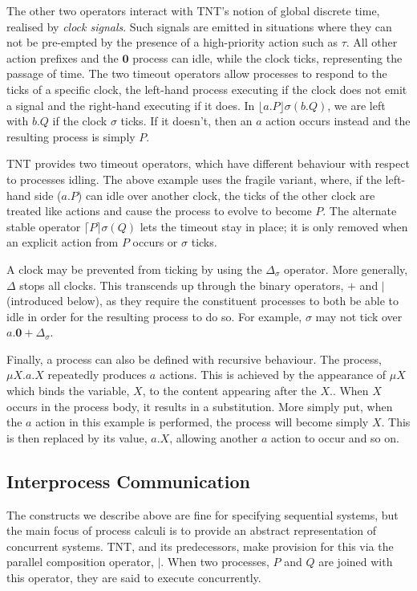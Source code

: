 \documentclass{sig-alternate}
\newcommand{\nil}{\textbf{0}}
\newcommand{\timeout}[3]{\lfloor{#1}\rfloor {#2} ({#3})}
\newcommand{\stimeout}[3]{\lceil{#1}\rceil {#2} ({#3})}
\begin{document}
The other two operators interact with TNT's notion of global discrete
time, realised by \emph{clock signals}.  Such signals are emitted in
situations where they can not be pre-empted by the presence of a
high-priority action such as $\tau$.  All other action prefixes and the
$\nil$ process can idle, while the clock ticks, representing the passage
of time.  The two timeout operators allow processes to respond to the
ticks of a specific clock, the left-hand process executing if the clock
does not emit a signal and the right-hand executing if it does.  In
$\timeout{a.P}{\sigma}{b.Q}$, we are left with $b.Q$ if the clock
$\sigma$ ticks.  If it doesn't, then an $a$ action occurs instead and
the resulting process is simply $P$.

TNT provides two timeout operators, which have different behaviour with
respect to processes idling.  The above example uses the fragile
variant, where, if the left-hand side ($a.P$) can idle over another
clock, the ticks of the other clock are treated like actions and cause
the process to evolve to become $P$.  The alternate stable operator
$\stimeout{P}{\sigma}{Q}$ lets the timeout stay in place; it is only
removed when an explicit action from $P$ occurs or $\sigma$ ticks.

A clock may be prevented from ticking by using the $\Delta_\sigma$
operator.  More generally, $\Delta$ stops all clocks.  This transcends
up through the binary operators, $+$ and $\mid$ (introduced below), as
they require the constituent processes to both be able to idle in order
for the resulting process to do so.  For example, $\sigma$ may not tick
over $a.\nil + \Delta_\sigma$.

Finally, a process can also be defined with recursive behaviour.  The
process, $\mu X.a.X$ repeatedly produces $a$ actions.  This is achieved
by the appearance of $\mu X$ which binds the variable, $X$, to the
content appearing after the $X.$.  When $X$ occurs in the process body,
it results in a substitution.  More simply put, when the $a$ action in
this example is performed, the process will become simply $X$.  This is
then replaced by its value, $a.X$, allowing another $a$ action to occur
and so on.

\subsection{Interprocess Communication}
\label{ipc}

The constructs we describe above are fine for specifying sequential
systems, but the main focus of process calculi is to provide an abstract
representation of concurrent systems.  TNT, and its predecessors, make
provision for this via the parallel composition operator, $\mid$.  When
two processes, $P$ and $Q$ are joined with this operator, they are said
to execute concurrently.  
\end{document}
